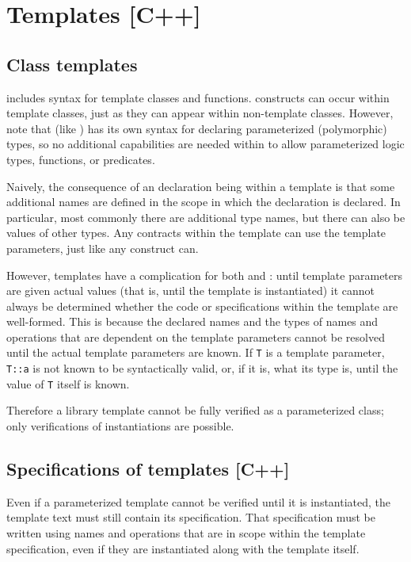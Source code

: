 \section{Templates [C++]}
\label{sec:templates}
\subsection{Class templates}

\lang includes syntax for template classes and functions.  \NAME constructs can occur within template classes, just as they can appear within non-template classes. However, note that \NAME (like \acsl) has its own syntax for declaring parameterized (polymorphic) types, so no additional 
capabilities are needed within \NAME to allow
parameterized logic types, functions, or predicates.

Naively, the consequence of an \NAME declaration being within a template is that some additional names are defined in the scope in which the \NAME declaration is declared. In particular, most commonly there are additional type names, but there can also be values of other types. Any \NAME contracts within the template can use the template parameters, just like any \lang construct can. 

However, templates have a complication for both \lang and \NAME: until template parameters are given actual values (that is, until the template is instantiated) it cannot always be determined whether the code or specifications within the template are well-formed. This is because the declared names and the types of names and operations that are dependent on the template parameters cannot be resolved until the actual template parameters are known.  If \lstinline|T| is a template parameter, \lstinline|T::a| is not known to be syntactically valid, or, if it is, what its type is, until the value of \lstinline|T| itself is known.

Therefore a library template cannot be fully verified as a parameterized class; only verifications of instantiations are possible.

\subsection{Specifications of templates [C++]}

Even if a parameterized template cannot be verified until it is instantiated, the template text must still contain its specification. That specification must be written using names and operations that are in scope within the template specification, even if they are instantiated along with the template itself.

